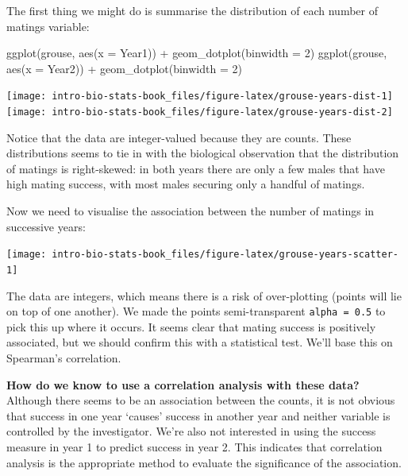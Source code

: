 \documentclass[
]{book}
\newenvironment{Shaded}{\begin{snugshade}}{\end{snugshade}}
\newcommand{\AttributeTok}[1]{\textcolor[rgb]{0.77,0.63,0.00}{#1}}
\newcommand{\DecValTok}[1]{\textcolor[rgb]{0.00,0.00,0.81}{#1}}
\newcommand{\FunctionTok}[1]{\textcolor[rgb]{0.00,0.00,0.00}{#1}}
\newcommand{\NormalTok}[1]{#1}
\newcommand{\SpecialCharTok}[1]{\textcolor[rgb]{0.00,0.00,0.00}{#1}}
\begin{document}
The first thing we might do is summarise the distribution of each number of matings variable:

\begin{Shaded}
\begin{Highlighting}[]
\FunctionTok{ggplot}\NormalTok{(grouse, }\FunctionTok{aes}\NormalTok{(}\AttributeTok{x =}\NormalTok{ Year1)) }\SpecialCharTok{+} \FunctionTok{geom\_dotplot}\NormalTok{(}\AttributeTok{binwidth =} \DecValTok{2}\NormalTok{)}
\FunctionTok{ggplot}\NormalTok{(grouse, }\FunctionTok{aes}\NormalTok{(}\AttributeTok{x =}\NormalTok{ Year2)) }\SpecialCharTok{+} \FunctionTok{geom\_dotplot}\NormalTok{(}\AttributeTok{binwidth =} \DecValTok{2}\NormalTok{)}
\end{Highlighting}
\end{Shaded}

\texttt{[image: intro-bio-stats-book\_files/figure-latex/grouse-years-dist-1]} \texttt{[image: intro-bio-stats-book\_files/figure-latex/grouse-years-dist-2]}

Notice that the data are integer-valued because they are counts. These distributions seems to tie in with the biological observation that the distribution of matings is right-skewed: in both years there are only a few males that have high mating success, with most males securing only a handful of matings.

Now we need to visualise the association between the number of matings in successive years:

\begin{center}\texttt{[image: intro-bio-stats-book\_files/figure-latex/grouse-years-scatter-1]} \end{center}

The data are integers, which means there is a risk of over-plotting (points will lie on top of one another). We made the points semi-transparent \texttt{alpha\ =\ 0.5} to pick this up where it occurs. It seems clear that mating success is positively associated, but we should confirm this with a statistical test. We'll base this on Spearman's correlation.

\textbf{How do we know to use a correlation analysis with these data?} Although there seems to be an association between the counts, it is not obvious that success in one year `causes' success in another year and neither variable is controlled by the investigator. We're also not interested in using the success measure in year 1 to predict success in year 2. This indicates that correlation analysis is the appropriate method to evaluate the significance of the association.
\end{document}
